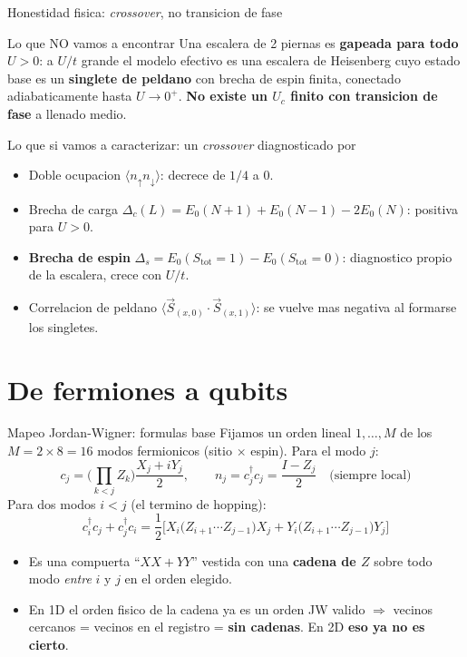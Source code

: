 \documentclass[aspectratio=169,10pt]{beamer}
\newcommand{\warn}[1]{\textcolor{qWarn}{\textbf{#1}}}
\begin{document}
\begin{frame}{Honestidad fisica: \emph{crossover}, no transicion de fase}
  \begin{alertblock}{Lo que NO vamos a encontrar}
    Una escalera de 2 piernas es \warn{gapeada para todo $U>0$}: a $U/t$ grande el modelo
    efectivo es una escalera de Heisenberg cuyo estado base es un \textbf{singlete de peldano}
    con brecha de espin finita, conectado adiabaticamente hasta $U\to0^+$.
    \textbf{No existe un $U_c$ finito con transicion de fase} a llenado medio.
  \end{alertblock}
  \begin{block}{Lo que si vamos a caracterizar: un \emph{crossover} diagnosticado por}
    \begin{itemize}
      \item Doble ocupacion $\langle n_\uparrow n_\downarrow\rangle$: decrece de $1/4$ a $0$.
      \item Brecha de carga $\Delta_c(L) = E_0(N{+}1)+E_0(N{-}1)-2E_0(N)$: positiva para $U>0$.
      \item \textbf{Brecha de espin} $\Delta_s = E_0(S_{\text{tot}}{=}1) - E_0(S_{\text{tot}}{=}0)$:
        diagnostico propio de la escalera, crece con $U/t$.
      \item Correlacion de peldano $\langle \vec S_{(x,0)}\cdot\vec S_{(x,1)}\rangle$: se
        vuelve mas negativa al formarse los singletes.
    \end{itemize}
  \end{block}
\end{frame}

\section{De fermiones a qubits}

\begin{frame}{Mapeo Jordan-Wigner: formulas base}
  Fijamos un orden lineal $1,\dots,M$ de los $M = 2\times8 = 16$ modos fermionicos
  (sitio $\times$ espin). Para el modo $j$:
  \[
    c_j = \Big(\prod_{k<j} Z_k\Big)\frac{X_j+iY_j}{2}, \qquad
    n_j = c_j^\dagger c_j = \frac{I-Z_j}{2} \quad \text{(siempre local)}
  \]
  Para dos modos $i<j$ (el termino de hopping):
  \[
    c^\dagger_i c_j + c^\dagger_j c_i = \frac{1}{2}\Big[X_i\big(Z_{i+1}\cdots Z_{j-1}\big)X_j
      + Y_i\big(Z_{i+1}\cdots Z_{j-1}\big)Y_j\Big]
  \]
  \begin{itemize}
    \item Es una compuerta ``$XX+YY$'' vestida con una \textbf{cadena de $Z$} sobre todo modo
      \emph{entre} $i$ y $j$ en el orden elegido.
    \item En 1D el orden fisico de la cadena ya es un orden JW valido $\Rightarrow$ vecinos
      cercanos = vecinos en el registro = \textbf{sin cadenas}. En 2D \warn{eso ya no es cierto}.
  \end{itemize}
\end{frame}
\end{document}
